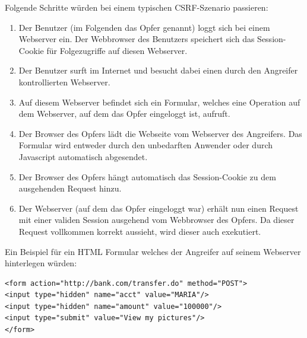 Folgende Schritte würden bei einem typischen CSRF-Szenario passieren:

\begin{enumerate}
\item Der Benutzer (im Folgenden das Opfer genannt) loggt sich bei einem Webserver ein. Der Webbrowser des Benutzers speichert sich das Session-Cookie für Folgezugriffe auf diesen Webserver.
\item Der Benutzer surft im Internet und besucht dabei einen durch den Angreifer kontrollierten Webserver.
\item Auf diesem Webserver befindet sich ein Formular, welches eine Operation auf dem Webserver, auf dem das Opfer eingeloggt ist, aufruft.
\item Der Browser des Opfers lädt die Webseite vom Webserver des Angreifers. Das Formular wird entweder durch den unbedarften Anwender oder durch Javascript automatisch abgesendet.
\item Der Browser des Opfers hängt automatisch das Session-Cookie zu dem ausgehenden Request hinzu.
\item Der Webserver (auf dem das Opfer eingeloggt war) erhält nun einen Request mit einer validen Session ausgehend vom Webbrowser des Opfers. Da dieser Request vollkommen korrekt aussieht, wird dieser auch exekutiert.
\end{enumerate}

Ein Beispiel für ein HTML Formular welches der Angreifer auf seinem Webserver hinterlegen würden:

\begin{verbatim}
<form action="http://bank.com/transfer.do" method="POST">
<input type="hidden" name="acct" value="MARIA"/>
<input type="hidden" name="amount" value="100000"/>
<input type="submit" value="View my pictures"/>
</form>
\end{verbatim}

